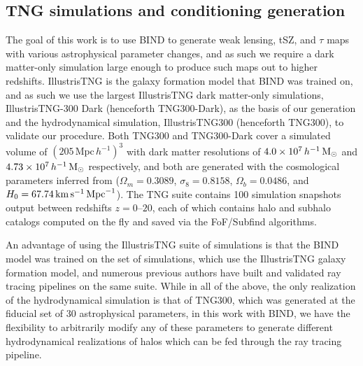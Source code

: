 \documentclass[linenumbers,trackchanges, twocolumn]{aastex701}
\begin{document}
\subsection{TNG simulations and conditioning generation}\label{sec:conditioning}
The goal of this work is to use BIND to generate weak lensing, tSZ, and $\tau$ maps with various astrophysical parameter changes, and as such we require a dark matter-only simulation large enough to produce such maps out to higher redshifts. IllustrisTNG \citep{Springel-2018} is the galaxy formation model that BIND was trained on, and as such we use the largest IllustrisTNG dark matter-only simulations, IllustrisTNG-300 Dark (henceforth TNG300-Dark), as the basis of our generation and the hydrodynamical simulation, IllustrisTNG300 (henceforth TNG300), to validate our procedure. Both TNG300 and TNG300-Dark cover a simulated volume of $(205\,\mathrm{Mpc}\,h^{-1})^3$ with dark matter resolutions of $4.0\times 10^7\,h^{-1}\,{\rm M}_\odot$ and $4.73\times 10^7\,h^{-1}\,{\rm M}_\odot$ respectively, and both are generated with the cosmological parameters inferred from \citet{planck-2015} ($\Omega_m = 0.3089$, $\sigma_8 = 0.8158$, $\Omega_b = 0.0486$, and $H_0 = 67.74\,{\rm km}\,{\rm s}^{-1}\,{\rm Mpc}^{-1}$). The TNG suite contains 100 simulation snapshots output between redshifts $z = 0$--$20$, each of which contains halo and subhalo catalogs computed on the fly and saved via the FoF/Subfind algorithms.

 
An advantage of using the IllustrisTNG suite of simulations is that the BIND model was trained on the \citet{Genel-2026} set of simulations, which use the IllustrisTNG galaxy formation model, and numerous previous authors have built and validated ray tracing pipelines \citep{Osato-2021, Lee-2023, Lee-2026, Lee-2026a} on the same suite. While in all of the above, the only realization of the hydrodynamical simulation is that of TNG300, which was generated at the fiducial set of 30 astrophysical parameters, in this work with BIND, we have the flexibility to arbitrarily modify any of these parameters to generate different hydrodynamical realizations of halos which can be fed through the ray tracing pipeline.
\end{document}
